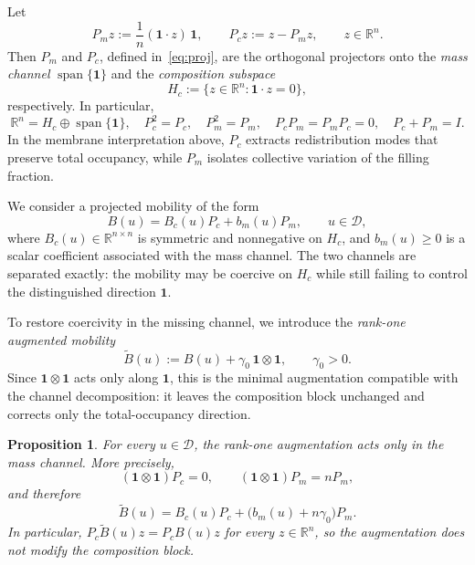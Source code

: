 \documentclass{article}
\newtheorem{proposition}[theorem]{Proposition}
\newcommand{\R}{\mathbb{R}}
\newcommand{\bone}{\mathbf{1}}
\newcommand{\D}{\mathcal{D}}
\newcommand{\Be}{\widetilde{B}}       %
\newcommand{\Pc}{P_c}                 %
\newcommand{\Pm}{P_m}                 %
\newcommand{\Hc}{H_c}                 %
\begin{document}
Let
\begin{equation}\label{eq:proj}
  \Pm z := \frac{1}{n}(\bone\cdot z)\,\bone, \qquad
  \Pc z := z - \Pm z, \qquad z\in\R^n.
\end{equation}
Then $\Pm$ and $\Pc$, defined in~\eqref{eq:proj}, are the orthogonal projectors onto the
\emph{mass channel} $\operatorname{span}\{\bone\}$ and the
\emph{composition subspace}
\[
  \Hc := \{z\in\R^n : \bone\cdot z = 0\},
\]
respectively. In particular,
\[
  \R^n = \Hc\oplus\operatorname{span}\{\bone\},
  \quad \Pc^2=\Pc,\quad \Pm^2=\Pm,
  \quad \Pc\Pm=\Pm\Pc=0,\quad \Pc+\Pm=I.
\]
In the membrane interpretation above, $\Pc$ extracts redistribution
modes that preserve total occupancy, while $\Pm$ isolates collective
variation of the filling fraction.

We consider a projected mobility of the form
\begin{equation*}
  B(u) = B_c(u)\Pc + b_m(u)\Pm, \qquad u\in\D,
\end{equation*}
where $B_c(u)\in\R^{n\times n}$ is symmetric and nonnegative on $\Hc$,
and $b_m(u)\ge 0$ is a scalar coefficient associated with the mass
channel. The two channels are separated exactly: the mobility may be
coercive on $\Hc$ while still failing to control the distinguished
direction $\bone$.

To restore coercivity in the missing channel, we introduce the
\emph{rank-one augmented mobility}
\begin{equation}\label{eq:Be_def}
  \Be(u) := B(u) + \gamma_0\,\bone\otimes\bone, \qquad \gamma_0 > 0.
\end{equation}
Since $\bone\otimes\bone$ acts only along $\bone$, this is the minimal
augmentation compatible with the channel decomposition: it leaves the
composition block unchanged and corrects only the total-occupancy
direction.

\begin{proposition}\label{prop:augm}
For every $u\in\D$, the rank-one augmentation acts only in the mass
channel. More precisely,
\begin{equation*}
  (\bone\otimes\bone)\Pc = 0, \qquad
  (\bone\otimes\bone)\Pm = n\Pm,
\end{equation*}
and therefore
\begin{equation}\label{eq:Be}
  \Be(u) = B_c(u)\Pc + \bigl(b_m(u)+n\gamma_0\bigr)\Pm.
\end{equation}
In particular, $\Pc\Be(u)z = \Pc B(u)z$ for every $z\in\R^n$, so the
augmentation does not modify the composition block.
\end{proposition}
\end{document}
